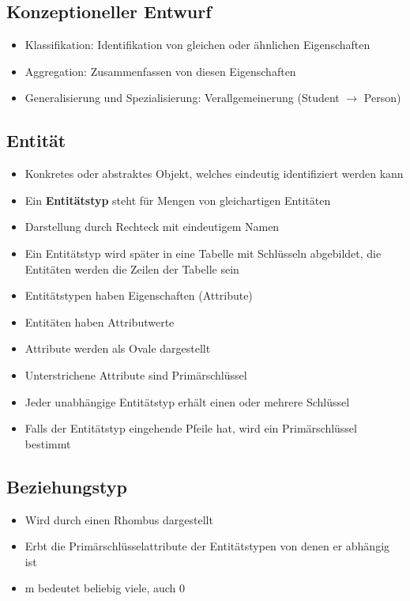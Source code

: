 \documentclass[8pt,a4paper]{scrartcl}
\begin{document}
\begin{multicols*}{3}
			\subsection{Konzeptioneller Entwurf}
				\begin{itemize}\itemsep0pt			
					\item Klassifikation: Identifikation von gleichen oder ähnlichen Eigenschaften
					\item Aggregation: Zusammenfassen von diesen Eigenschaften
					\item Generalisierung und Spezialisierung: Verallgemeinerung (Student $\rightarrow$ Person)
				\end{itemize}
						
			\subsection{Entität}
				\begin{itemize}\itemsep0pt			
					\item Konkretes oder abstraktes Objekt, welches eindeutig identifiziert werden kann
					\item Ein \textbf{Entitätstyp} steht für Mengen von gleichartigen Entitäten
					\item Darstellung durch Rechteck mit eindeutigem Namen
					\item Ein Entitätstyp wird später in eine Tabelle mit Schlüsseln abgebildet, die Entitäten werden die Zeilen der Tabelle sein
					\item Entitätstypen haben Eigenschaften (Attribute)
					\item Entitäten haben Attributwerte
					\item Attribute werden als Ovale dargestellt
					\item Unterstrichene Attribute sind Primärschlüssel 
					\item Jeder unabhängige Entitätstyp erhält einen oder mehrere Schlüssel
					\item Falls der Entitätstyp eingehende Pfeile hat, wird ein Primärschlüssel bestimmt
				\end{itemize}
				
			\subsection{Beziehungstyp}
				\begin{itemize}\itemsep0pt			
					\item Wird durch einen Rhombus dargestellt
					\item Erbt die Primärschlüsselattribute der Entitätstypen von denen er abhängig ist
					\item m bedeutet beliebig viele, auch 0
				\end{itemize}
				

\end{multicols*}
\end{document}
